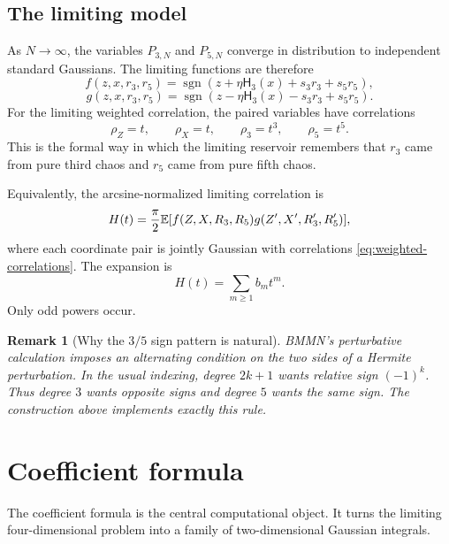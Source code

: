 \documentclass[11pt]{article}
\newtheorem{remark}[theorem]{Remark}
\newcommand{\E}{\mathbb{E}}
\newcommand{\1}{\mathbf{1}}
\newcommand{\sgn}{\operatorname{sgn}}
\newcommand{\Herm}{\mathsf H}
\begin{document}
\subsection{The limiting model}

As \(N\to\infty\), the variables \(P_{3,N}\) and \(P_{5,N}\) converge in distribution to independent standard Gaussians.  The limiting functions are therefore
\begin{equation}\label{eq:limit-f}
        f(z,x,r_3,r_5)=\sgn\left(z+\eta\Herm_3(x)+s_3r_3+s_5r_5\right),
\end{equation}
\begin{equation}\label{eq:limit-g}
        g(z,x,r_3,r_5)=\sgn\left(z-\eta\Herm_3(x)-s_3r_3+s_5r_5\right).
\end{equation}
For the limiting weighted correlation, the paired variables have correlations
\begin{equation}\label{eq:weighted-correlations}
        \rho_Z=t,
        \qquad \rho_X=t,
        \qquad \rho_3=t^3,
        \qquad \rho_5=t^5.
\end{equation}
This is the formal way in which the limiting reservoir remembers that \(r_3\) came from pure third chaos and \(r_5\) came from pure fifth chaos.

Equivalently, the arcsine-normalized limiting correlation is
\begin{equation}\label{eq:Hlim-def}
        H(t)={\pi\over2}\E[f(Z,X,R_3,R_5)g(Z',X',R_3',R_5')],
\end{equation}
where each coordinate pair is jointly Gaussian with correlations \eqref{eq:weighted-correlations}.  The expansion is
\[
        H(t)=\sum_{m\ge1}b_m t^m.
\]
Only odd powers occur.

\begin{remark}[Why the \(3/5\) sign pattern is natural]
BMMN's perturbative calculation imposes an alternating condition on the two sides of a Hermite perturbation.  In the usual indexing, degree \(2k+1\) wants relative sign \((-1)^k\).  Thus degree \(3\) wants opposite signs and degree \(5\) wants the same sign.  The construction above implements exactly this rule.
\end{remark}

\section{Coefficient formula}

The coefficient formula is the central computational object.  It turns the limiting four-dimensional problem into a family of two-dimensional Gaussian integrals.
\end{document}
